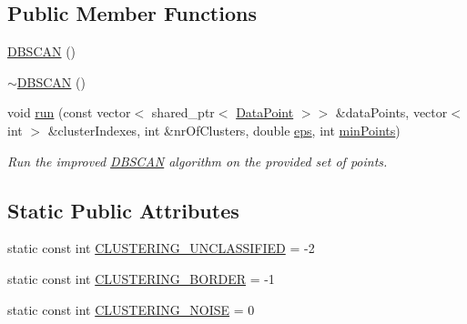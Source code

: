 \subsection*{\-Public \-Member \-Functions}
\begin{DoxyCompactItemize}
\item 
\hyperlink{classmultiscale_1_1analysis_1_1DBSCAN_abcfe88a7c0a94730a128e4682d8f27ca}{\-D\-B\-S\-C\-A\-N} ()
\item 
\hyperlink{classmultiscale_1_1analysis_1_1DBSCAN_a4deb359da661ba495d18a75f43a0b89c}{$\sim$\-D\-B\-S\-C\-A\-N} ()
\item 
void \hyperlink{classmultiscale_1_1analysis_1_1DBSCAN_a52f0eb2d04029c75a3c48a37efdac26b}{run} (const vector$<$ shared\-\_\-ptr$<$ \hyperlink{classmultiscale_1_1analysis_1_1DataPoint}{\-Data\-Point} $>$$>$ \&data\-Points, vector$<$ int $>$ \&cluster\-Indexes, int \&nr\-Of\-Clusters, double \hyperlink{classmultiscale_1_1analysis_1_1DBSCAN_a8d68cd84561cbb06bd138f8edf340b9f}{eps}, int \hyperlink{classmultiscale_1_1analysis_1_1DBSCAN_a7bafd4070ac44e236fcc7f06d92b6572}{min\-Points})
\begin{DoxyCompactList}\small\item\em \-Run the improved \hyperlink{classmultiscale_1_1analysis_1_1DBSCAN}{\-D\-B\-S\-C\-A\-N} algorithm on the provided set of points. \end{DoxyCompactList}\end{DoxyCompactItemize}
\subsection*{\-Static \-Public \-Attributes}
\begin{DoxyCompactItemize}
\item 
static const int \hyperlink{classmultiscale_1_1analysis_1_1DBSCAN_a6f60961639281a807b63650faf01511b}{\-C\-L\-U\-S\-T\-E\-R\-I\-N\-G\-\_\-\-U\-N\-C\-L\-A\-S\-S\-I\-F\-I\-E\-D} = -\/2
\item 
static const int \hyperlink{classmultiscale_1_1analysis_1_1DBSCAN_a28f37ffc029ccd1d121cbc4467851ce2}{\-C\-L\-U\-S\-T\-E\-R\-I\-N\-G\-\_\-\-B\-O\-R\-D\-E\-R} = -\/1
\item 
static const int \hyperlink{classmultiscale_1_1analysis_1_1DBSCAN_a480b43a01f8652787a4b0f61b00ee3cf}{\-C\-L\-U\-S\-T\-E\-R\-I\-N\-G\-\_\-\-N\-O\-I\-S\-E} = 0
\end{DoxyCompactItemize}
